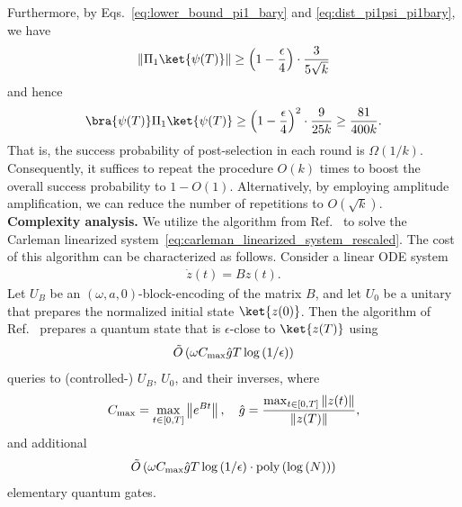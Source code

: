 \documentclass[superscriptaddress,onecolumn,nofootinbib,longbibliography,a4paper,accepted=2026-09-29]{quantumarticle}
\theoremstyle{plain}
\theoremstyle{definition}
\numberwithin{thm}{section}
\numberwithin{assumption}{section}
\numberwithin{lemma}{section}
\numberwithin{prop}{section}
\numberwithin{cor}{section}
\numberwithin{definition}{section}
\numberwithin{rmk}{section}
\numberwithin{equation}{section}
\newcommand{\norm}[1]     {\left\| #1 \right\|}
\newcommand{\lrb}[1]{\left ( #1 \right )}
\newcommand{\mypoly}[1]{\operatorname{poly} \lrb{#1}}
\newcommand{\mylog}[1]{\operatorname{log} \lrb{#1}}
\newcommand{\myO}[1]{O\lrb{#1}}
\newcommand{\mytO}[1]{\tilde{O}\lrb{#1}}
\newcommand{\myOmega}[1]{\Omega\lrb{#1}}
\begin{document}
Furthermore, by Eqs.~\eqref{eq:lower_bound_pi1_bary} and \eqref{eq:dist_pi1psi_pi1bary}, we have
\begin{align}
    \norm{\Pi_1 \ket{\psi(T)} } \ge \lrb{1-\frac{\epsilon}{4}} \cdot \frac{3}{5\sqrt{k}}
\end{align}
and hence
\begin{align}
    \bra{\psi(T)}\Pi_1 \ket{\psi(T)} \ge \lrb{1-\frac{\epsilon}{4}}^2 \cdot \frac{9}{25k} \ge \frac{81}{400k}.
\end{align}
That is, the success probability of post-selection in each round is $\myOmega{1/k}$. Consequently, it suffices to repeat the procedure $\myO{k}$ times to boost the overall success probability to $1-\myO{1}$. Alternatively, by employing amplitude amplification, we can reduce the number of repetitions to $\myO{\sqrt{k}}$.\\

\noindent\textbf{Complexity analysis.}
We utilize the algorithm from Ref.~\cite{jennings2023cost} to solve the Carleman linearized system~\eqref{eq:carleman_linearized_system_rescaled}. The cost of this algorithm can be characterized as follows. Consider a linear ODE system
\begin{align}
    \dot{z}(t)  = B z(t).
\end{align}
Let $U_B$ be an $(\omega, a, 0)$-block-encoding of the matrix $B$, and let $U_0$ be a unitary that prepares the normalized initial state $\ket{z(0)}$. Then the algorithm of Ref.~\cite{jennings2023cost} prepares a quantum state that is $\epsilon$-close to $\ket{z(T)}$ using
$$\mytO{\omega C_{\rm max}\hat{g}T\mylog{1/\epsilon}}$$
queries to (controlled-) $U_B$, $U_0$, and their inverses, where 
\begin{align}
C_{\rm max} = \max_{t \in [0,T]} \norm{e^{Bt}},~~~\hat{g}=\frac{\max_{t \in [0,T]} \norm{z(t)}}{\norm{z(T)}},
\end{align}
and additional
$$\mytO{\omega C_{\rm max}\hat{g}T\mylog{1/\epsilon}\cdot \mypoly{\mylog{N}}}$$
elementary quantum gates.
\end{document}
